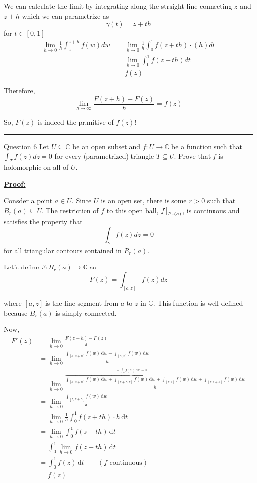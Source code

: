 \documentclass{article}
\newcommand{\C}{\mathbb{C}}
\newcommand{\restr}[2]{{%
  \left.\kern-\nulldelimiterspace %
  #1 %
  \vphantom{\big|} %
  \right|_{#2} %
  }}
\begin{document}
We can calculate the limit by integrating along the straight line connecting $z$ and $z+h$ which we can parametrize as 
\[ \gamma(t) = z + th \] for $t \in [0, 1]$
\begin{align*}
  \lim_{h \rightarrow 0} \frac{1}{h} \int_{z}^{z+h} f(w) dw &=  \lim_{h \rightarrow 0} \frac{1}{h} \int_{0}^{1} f(z + th) \cdot \left(h\right) dt\\
  &= \lim_{h \rightarrow 0} \int_{0}^{1} f(z + th) dt \\
  &= f(z)
\end{align*}

Therefore, 
\[  \boxed{ \lim_{h \rightarrow \infty} \frac{F(z+h) - F(z)}{h}  = f(z) }  \]

\vskip 0.5cm
So, $F(z)$ is indeed the primitive of $f(z)$!

\vskip 0.5cm
\hrule 
\vskip 0.5cm




\begin{mathdefinitionbox}{Question 6}
\vskip 0.5cm
Let $U \subseteq \C$ be an open subset and $f : U \rightarrow \C$ be a function such that $\int_T f(z) dz = 0$ for every (parametrized) triangle $T \subseteq U$. Prove that $f$ is holomorphic on all of $U$.
\end{mathdefinitionbox}

\vskip 0.5cm
\underline{\textbf{Proof:}}


Consder a point $a \in U$. Since $U$ is an open set, there is some $r > 0$ such that $B_r(a) \subseteq U$. The restriction of $f$ to this open ball, $\restr{f}{B_r(a)}$, is continuous and  satisfies the property that 
\[ \int_{\gamma} f(z) dz = 0 \]
for all triangular contours contained in $B_r(a)$.

\vskip 0.5cm
Let's define $F : B_r(a) \rightarrow \C$ as 
\[ F(z) = \int_{[a,z]} f(z) dz \]

where $[a, z]$ is the line segment from $a$ to $z$ in $\C$. This function is well defined because $B_r(a)$ is simply-connected.

\vskip 0.5cm
Now,
\begin{align*}
  F'(z) &=\lim_{h\to0}\frac{F(z+h)-F(z)}h\\
  &=\lim_{h\to0}\frac{\int_{[a,z+h]}f(w)\,\mathrm{d}w-\int_{[a,z]}f(w)\,\mathrm{d}w}h\\
  &=\lim_{h\to0}\frac{\overbrace{\int_{[a,z+h]}f(w)\,\mathrm{d}w+\int_{[z+h,z]}f(w)\,\mathrm{d}w+\int_{[z,a]}f(w)\,\mathrm{d}w}^{=\int_\gamma f(w)\,\mathrm{d}w=0}+\int_{[z,z+h]}f(w)\,\mathrm{d}w}h\\
  &=\lim_{h\to0}\frac{\int_{[z,z+h]}f(w)\,\mathrm{d}w}h\\
  &=\lim_{h\to0}\frac1h\int_0^1f(z+th)\cdot h\,\mathrm{d}t\\
  &=\lim_{h\to0}\int_0^1f(z+th)\,\mathrm{d}t\\
  &=\int_0^1\lim_{h\to0}f(z+th)\,\mathrm{d}t\\
  &=\int_0^1f(z)\,\mathrm{d}t\qquad(f\text{ continuous})\\
  &=f(z)
\end{align*}
\end{document}
